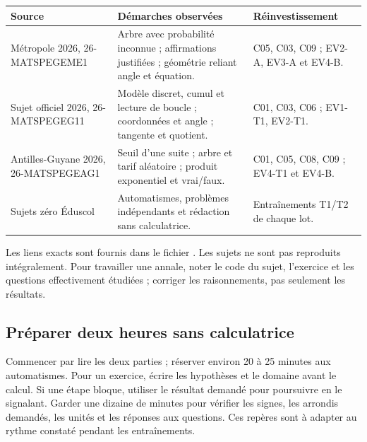\begin{longtable}{p{.22\linewidth}p{.38\linewidth}p{.29\linewidth}}
\toprule Source & Démarches observées & Réinvestissement \\\midrule
Métropole 2026, 26-MATSPEGEME1 & Arbre avec probabilité inconnue ; affirmations justifiées ; géométrie reliant angle et équation. & C05, C03, C09 ; EV2-A, EV3-A et EV4-B.\\
Sujet officiel 2026, 26-MATSPEGEG11 & Modèle discret, cumul et lecture de boucle ; coordonnées et angle ; tangente et quotient. & C01, C03, C06 ; EV1-T1, EV2-T1.\\
Antilles-Guyane 2026, 26-MATSPEGEAG1 & Seuil d’une suite ; arbre et tarif aléatoire ; produit exponentiel et vrai/faux. & C01, C05, C08, C09 ; EV4-T1 et EV4-B.\\
Sujets zéro Éduscol & Automatismes, problèmes indépendants et rédaction sans calculatrice. & Entraînements T1/T2 de chaque lot.\\\bottomrule
\end{longtable}
Les liens exacts sont fournis dans le fichier . Les sujets ne sont pas reproduits intégralement. Pour travailler une annale, noter le code du sujet, l’exercice et les questions effectivement étudiées ; corriger les raisonnements, pas seulement les résultats.

\subsection*{Préparer deux heures sans calculatrice}
Commencer par lire les deux parties ; réserver environ 20 à 25 minutes aux automatismes. Pour un exercice, écrire les hypothèses et le domaine avant le calcul. Si une étape bloque, utiliser le résultat demandé pour poursuivre en le signalant. Garder une dizaine de minutes pour vérifier les signes, les arrondis demandés, les unités et les réponses aux questions. Ces repères sont à adapter au rythme constaté pendant les entraînements.
